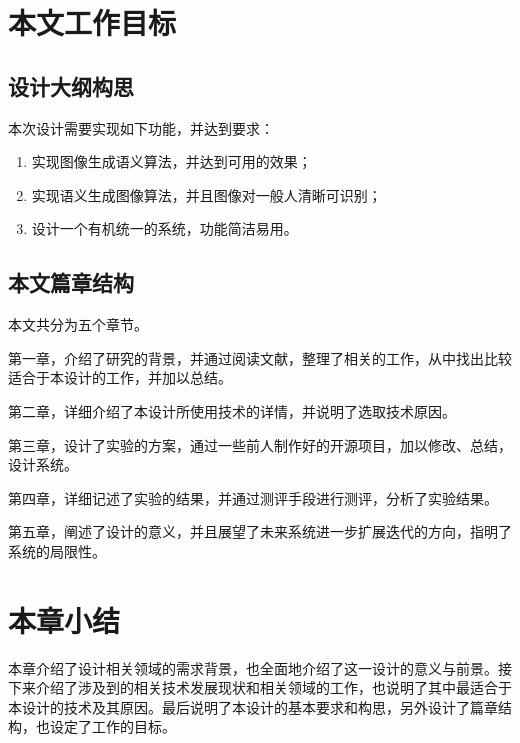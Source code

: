 \section{本文工作目标}

\subsection{设计大纲构思}
本次设计需要实现如下功能，并达到要求：
\begin{enumerate}[fullwidth,itemindent=2em,label=\arabic*.]
    \item 实现图像生成语义算法，并达到可用的效果；
    \item 实现语义生成图像算法，并且图像对一般人清晰可识别；
    \item 设计一个有机统一的系统，功能简洁易用。
\end{enumerate}

\subsection{本文篇章结构}

本文共分为五个章节。

第一章，介绍了研究的背景，并通过阅读文献，整理了相关的工作，从中找出比较适合于本设计的工作，并加以总结。

第二章，详细介绍了本设计所使用技术的详情，并说明了选取技术原因。

第三章，设计了实验的方案，通过一些前人制作好的开源项目，加以修改、总结，设计系统。

第四章，详细记述了实验的结果，并通过测评手段进行测评，分析了实验结果。

第五章，阐述了设计的意义，并且展望了未来系统进一步扩展迭代的方向，指明了系统的局限性。

\section{本章小结}
本章介绍了设计相关领域的需求背景，也全面地介绍了这一设计的意义与前景。接下来介绍了涉及到的相关技术发展现状和相关领域的工作，也说明了其中最适合于本设计的技术及其原因。最后说明了本设计的基本要求和构思，另外设计了篇章结构，也设定了工作的目标。
